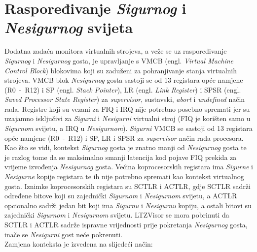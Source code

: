 \documentclass[times, utf8, diplomski, numeric]{fer}
\begin{document}
\section{Raspoređivanje \textit{Sigurnog} i \textit{Nesigurnog} svijeta}
Dodatna zadaća monitora virtualnih strojeva, a veže se uz raspoređivanje \textit{Sigurnog} i \textit{Nesigurnog} gosta, je upravljanje s
VMCB (engl. \textit{Virtual Machine Control Block}) blokovima koji su zaduženi za pohranjivanje stanja virtualnih strojeva.
VMCB blok \textit{Nesigurnog} gosta sastoji se od 13 registara opće namjene (R0~-~R12) i SP (engl. \textit{Stack Pointer}), LR
(engl. \textit{Link Register}) i SPSR (engl. \textit{Saved Processor State Register}) za \textit{supervisor}, sustavski,
\textit{abort} i \textit{undefined} način rada. Registre koji su vezani za FIQ i IRQ nije potrebno posebno spremati jer su
uzajamno isključivi za \textit{Sigurni} i \textit{Nesigurni} virtualni stroj (FIQ je korišten samo u \textit{Sigurnom} svijetu, a IRQ u \textit{Nesigurnom}).
\textit{Sigurni} VMCB se sastoji od 13 registara opće namjene (R0~-~R12) i SP, LR i SPSR za \textit{supervisor} način rada procesora.
Kao što se vidi, kontekst \textit{Sigurnog} gosta je znatno manji od \textit{Nesigurnog} gosta te je razlog tome da se maksimalno smanji
latencija kod pojave FIQ prekida za vrijeme izvođenja \textit{Nesigurnog} gosta. Većina koprocesorskih registara ima \textit{Sigurne} i \textit{Nesigurne}
kopije registara te ih nije potrebno spremati kao kontekst virtualnog gosta. Iznimke koprocesorskih registara su SCTLR i
ACTLR, gdje SCTLR sadrži određene bitove koji su zajednički \textit{Sigurnom} i \textit{Nesigurnom} svijetu, a ACTLR opcionalno sadrži jedan
bit koji ima \textit{Sigurnu} i \textit{Nesigurnu} kopiju, a ostali bitovi su zajednički \textit{Sigurnom} i \textit{Nesigurnom} svijetu. LTZVisor se mora pobrinuti
da SCTLR i ACTLR sadrže ispravne vrijednosti prije pokretanja \textit{Nesigurnog} gosta, inače se \textit{Nesigurni} gost neće pokrenuti.\\
Zamjena konteksta je izvedena na slijedeći način:
\end{document}
